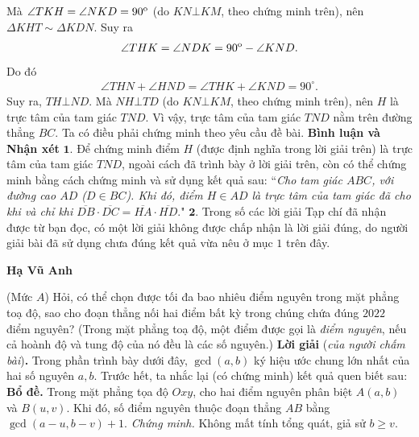 \begin{multicols}{2}
	Mà  $\angle TKH = \angle NKD = {90^{\rm{o}}}$ (do $KN \bot KM$, theo chứng minh trên), nên $\Delta KHT \sim  \Delta KDN$. Suy ra
	\begin{align*}
		\angle THK = \angle NDK = {90^{\rm{o}}} - \angle KND.
	\end{align*}
	Do đó
	\begin{align*}
		\angle THN + \angle HND = \angle THK + \angle KND = {90^\circ}.
	\end{align*}
	Suy ra, $TH \bot ND$. Mà $NH \bot TD$ (do $KN \bot KM$, theo chứng minh trên), nên $H$ là trực tâm của tam giác $TND$. Vì vậy, trực tâm của tam giác $TND$ nằm trên đường thẳng $BC$.
	\vskip 0.05cm
	Ta có điều phải chứng minh theo yêu cầu đề bài.
	\vskip 0.05cm
	\textbf{\color{thachthuctoanhoc}Bình luận và Nhận xét}
	\vskip 0.05cm
	$\pmb{1.}$ Để chứng minh điểm $H$ (được định nghĩa trong lời giải trên) là trực tâm của tam giác $TND$, ngoài cách đã trình bày ở lời giải trên, còn có thể chứng minh bằng cách chứng minh và sử dụng kết quả sau:
	\vskip 0.05cm
	``\textit{Cho tam giác $ABC$, với đường cao $AD$ ($D \in BC$). Khi đó, điểm $H \in AD$ là trực tâm của tam giác đã cho khi và chỉ khi  $\overline {DB}  \cdot \overline {DC}  = \overline {HA}  \cdot \overline {HD} .$}"
	\vskip 0.05cm
	$\pmb{2.}$ Trong số các lời giải Tạp chí đã nhận được từ bạn đọc, có một lời giải không được chấp nhận là lời giải đúng, do người giải bài đã sử dụng chưa đúng kết quả vừa nêu ở mục $1$ trên đây.
	\begin{flushright}
		\textbf{\color{thachthuctoanhoc}Hạ Vũ Anh}
	\end{flushright}
	{}
	(Mức $A$) Hỏi, có thể chọn được tối đa bao nhiêu điểm nguyên trong mặt phẳng toạ độ, sao cho đoạn thẳng nối hai điểm bất kỳ trong chúng chứa đúng $2022$ điểm nguyên?
	\vskip 0.05cm
	(Trong mặt phẳng toạ độ, một điểm được gọi là {\it điểm nguyên}, nếu cả hoành độ và tung độ của nó đều là các số nguyên.)
	\vskip 0.05cm
	\textbf{\color{thachthuctoanhoc}Lời giải} (\textit{của người chấm bài})\textbf{\color{thachthuctoanhoc}.}
	\vskip 0.05cm
	Trong phần trình bày dưới đây, $\gcd(a, b)$ ký hiệu ước chung lớn nhất của hai số nguyên $a, b$.\vskip 0.05cm
	Trước hết, ta nhắc lại (có chứng minh) kết quả quen biết sau:
	\vskip 0.05cm
	\textbf{\color{thachthuctoanhoc}Bổ đề.} Trong mặt phẳng tọa độ $Oxy$, cho hai điểm nguyên phân biệt $A(a, b)$ và $B(u, v)$. Khi đó, số điểm nguyên thuộc đoạn thẳng $AB$ bằng $\gcd(a - u, b - v) + 1$.
	\vskip 0.05cm
	\textit{Chứng minh.}
	\vskip 0.05cm
	Không mất tính tổng quát, giả sử $b \ge  v$.

\end{multicols}
